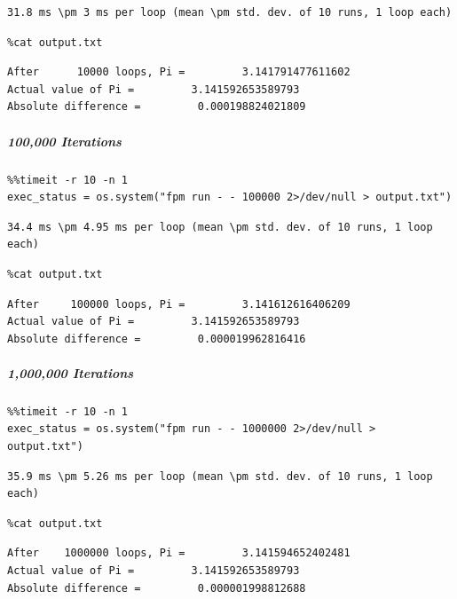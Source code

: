 \begin{verbatim}
31.8 ms \pm 3 ms per loop (mean \pm std. dev. of 10 runs, 1 loop each)
\end{verbatim}

\begin{verbatim}
%cat output.txt
\end{verbatim}

\begin{verbatim}
After      10000 loops, Pi =         3.141791477611602
Actual value of Pi =         3.141592653589793
Absolute difference =         0.000198824021809
\end{verbatim}

\subparagraph{100,000 Iterations}

\begin{verbatim}
%%timeit -r 10 -n 1
exec_status = os.system("fpm run - - 100000 2>/dev/null > output.txt")
\end{verbatim}

\begin{verbatim}
34.4 ms \pm 4.95 ms per loop (mean \pm std. dev. of 10 runs, 1 loop each)
\end{verbatim}

\begin{verbatim}
%cat output.txt
\end{verbatim}

\begin{verbatim}
After     100000 loops, Pi =         3.141612616406209
Actual value of Pi =         3.141592653589793
Absolute difference =         0.000019962816416
\end{verbatim}

\subparagraph{1,000,000 Iterations}

\begin{verbatim}
%%timeit -r 10 -n 1
exec_status = os.system("fpm run - - 1000000 2>/dev/null > output.txt")
\end{verbatim}

\begin{verbatim}
35.9 ms \pm 5.26 ms per loop (mean \pm std. dev. of 10 runs, 1 loop each)
\end{verbatim}

\begin{verbatim}
%cat output.txt
\end{verbatim}

\begin{verbatim}
After    1000000 loops, Pi =         3.141594652402481
Actual value of Pi =         3.141592653589793
Absolute difference =         0.000001998812688
\end{verbatim}

